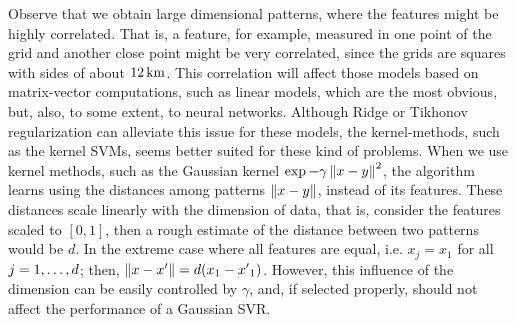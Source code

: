 %
Observe that we obtain large dimensional patterns, where the features might be highly correlated. That is, a feature,  for example, measured in one point of the grid and another close point might be very correlated, since the grids are squares with sides of about $\SI{12}{\kilo\metre}$.
This correlation will affect those models based on matrix-vector computations, such as linear models, which are the most obvious, but, also, to some extent, to neural networks.
Although Ridge or Tikhonov regularization can alleviate this issue for these models, the kernel-methods, such as the kernel SVMs, seems better suited for these kind of problems.
When we use kernel methods, such as the Gaussian kernel $\exp{-\gamma \left\lVert x-y\right\rVert^2}$, the algorithm learns using the distances among patterns $\left\lVert x - y\right\rVert$, instead of its features.
%
These distances scale linearly with the dimension of data, that is, consider the features scaled to $[0, 1]$, then a rough estimate of the distance between two patterns would be $d$. In the extreme case where all features are equal, i.e. $x_j = x_1$ for all $j=1, \ldots, d$; then, $\left\lVert x - x'\right\rVert = d(x_1 - {x'}_1)$.
However, this influence of the dimension can be easily controlled by $\gamma$, and, if selected properly, should not affect the performance of a Gaussian SVR.

